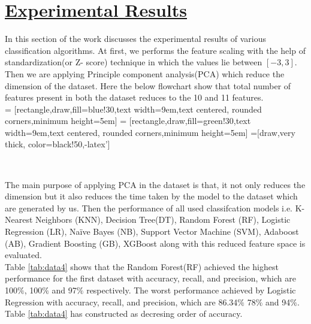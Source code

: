 \documentclass[11pt]{article}
\begin{document}
\section{\underline{Experimental Results}}

In this section of the work discusses the experimental results of various classification algorithms. At first, we performs the feature scaling with the help of standardization(or Z- score) technique in which the values lie between $[-3,3]$. Then we are applying Principle component analysis(PCA) which reduce the dimension of the dataset. Here the below flowchart show that total number of features present in both the dataset reduces to the 10 and 11 features.  \\

= [rectangle,draw,fill=blue!30,text width=9em,text centered, rounded corners,minimum height=5em]
= [rectangle,draw,fill=green!30,text width=9em,text centered, rounded corners,minimum height=5em]
=[draw,very thick, color=black!50,-latex']
\begin{center}
\\

\end{center}
The main purpose of applying PCA in the dataset is that, it not only reduces the dimension but it also reduces the time taken by the model to the dataset which are generated by us. Then the performance of all used classifcation models i.e. K-Nearest Neighbors (KNN), Decision Tree(DT), Random Forest (RF), Logistic Regression (LR), Naïve Bayes (NB), Support Vector Machine (SVM), Adaboost (AB), Gradient Boosting (GB), XGBoost along with this reduced feature space is evaluated.\\
Table \ref{tab:data4} shows that the Random Forest(RF) achieved the highest performance for the first dataset with accuracy, recall, and precision, which are 100$\%$, 100$\%$  and  97$\%$ respectively. The worst performance achieved by Logistic Regression with accuracy, recall, and precision, which are 86.34$\%$ 78$\%$  and  94$\%$. Table  \ref{tab:data4} has constructed  as decresing order of accuracy.
\end{document}
